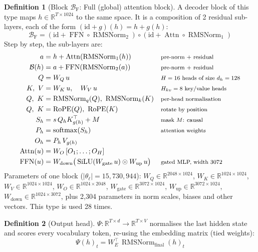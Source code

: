\documentclass[10pt,a4paper]{article}
\newcommand{\op}[1]{\operatorname{#1}}
\theoremstyle{definition}
\newtheorem{definition}{Definition}[section]
\begin{document}
\begin{definition}[Block $\mathcal{B}_{\mathrm{F}}$: Full (global) attention block]
A decoder block of this type maps $h\in\mathbb{R}^{T\times 1024}$ to the same space. It is a composition of 2 residual sub-layers, each of the form $(\mathrm{id}+g)(h)=h+g(h)$:
\begin{equation}
  \mathcal{B}_{\mathrm{F}} = (\mathrm{id}+\op{FFN}\circ \op{RMSNorm}_{2})\circ(\mathrm{id}+\op{Attn}\circ \op{RMSNorm}_{1})
\end{equation}
Step by step, the sub-layers are:
\begin{align*}
  a &= h + \op{Attn}(\op{RMSNorm}_{1}(h)) && \text{\footnotesize pre-norm + residual} \\
  \mathcal{B}(h) &= a + \op{FFN}(\op{RMSNorm}_{2}(a)) && \text{\footnotesize pre-norm + residual} \\
  Q &= W_Q\,u && \text{\footnotesize $H=16$ heads of size $d_h=128$} \\
  K,\ V &= W_K\,u,\quad W_V\,u && \text{\footnotesize $H_{kv}=8$ key/value heads} \\
  Q,\ K &= \op{RMSNorm}_q(Q),\ \op{RMSNorm}_k(K) && \text{\footnotesize per-head normalisation} \\
  Q,\ K &= \op{RoPE}(Q),\ \op{RoPE}(K) && \text{\footnotesize rotate by position} \\
  S_h &= s\, Q_h K_{g(h)}^{\top} + M && \text{\footnotesize mask $M$: causal} \\
  P_h &= \op{softmax}(S_h) && \text{\footnotesize attention weights} \\
  O_h &= P_h\, V_{g(h)} \\
  \op{Attn}(u) &= W_O\,[O_1;\dots;O_H] \\
  \op{FFN}(u) &= W_{\mathrm{down}}\big(\op{SiLU}(W_{\mathrm{gate}}\,u)\odot W_{\mathrm{up}}\,u\big) && \text{\footnotesize gated MLP, width 3072}
\end{align*}
Parameters of one block ($|\theta_\ell|=15{,}730{,}944$): $W_Q\in\mathbb{R}^{2048\times1024}$, $W_K\in\mathbb{R}^{1024\times1024}$, $W_V\in\mathbb{R}^{1024\times1024}$, $W_O\in\mathbb{R}^{1024\times2048}$, $W_{\mathrm{gate}}\in\mathbb{R}^{3072\times1024}$, $W_{\mathrm{up}}\in\mathbb{R}^{3072\times1024}$, $W_{\mathrm{down}}\in\mathbb{R}^{1024\times3072}$, plus 2,304 parameters in norm scales, biases and other vectors. This type is used 28 times.
\end{definition}
\begin{definition}[Output head]
$\Psi:\mathbb{R}^{T\times d}\to\mathbb{R}^{T\times V}$ normalises the last hidden state and scores every vocabulary token, re-using the embedding matrix (tied weights):
\begin{equation}
  \Psi(h)_t = W_E^{\top}\,\op{RMSNorm}_{\mathrm{final}}(h)_t
\end{equation}
\end{definition}
\end{document}
